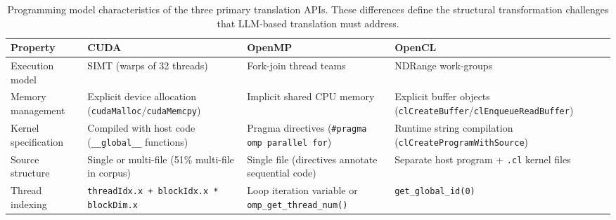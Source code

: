 



\begin{table}[htbp]
\centering
\caption{Programming model characteristics of the three primary translation APIs. These differences define the structural transformation challenges that LLM-based translation must address.}
\label{tab:api-characteristics}
\small
\begin{tabular}{@{}lp{4.0cm}p{4.0cm}p{4.0cm}@{}}
\toprule
Property & CUDA & OpenMP & OpenCL \\
\midrule
Execution model & SIMT (warps of 32 threads) & Fork-join thread teams & NDRange work-groups \\
Memory management & Explicit device allocation (\texttt{cudaMalloc}/\texttt{cudaMemcpy}) & Implicit shared CPU memory & Explicit buffer objects (\texttt{clCreateBuffer}/\texttt{clEnqueueReadBuffer}) \\
Kernel specification & Compiled with host code (\texttt{\_\_global\_\_} functions) & Pragma directives (\texttt{\#pragma omp parallel for}) & Runtime string compilation (\texttt{clCreateProgramWithSource}) \\
Source structure & Single or multi-file (51\% multi-file in corpus) & Single file (directives annotate sequential code) & Separate host program + \texttt{.cl} kernel files \\
Thread indexing & \texttt{threadIdx.x + blockIdx.x * blockDim.x} & Loop iteration variable or \texttt{omp\_get\_thread\_num()} & \texttt{get\_global\_id(0)} \\
\bottomrule
\end{tabular}
\end{table}


